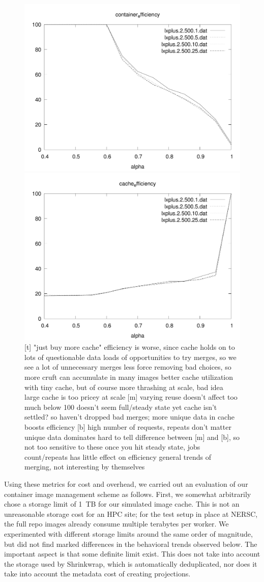 \documentclass[sigconf]{acmart}
\begin{document}
\begin{figure}
\includegraphics[width=0.48\linewidth]{curated/sensitivity/container_efficiency_uses_percent_plt.pdf}
\hfill
\includegraphics[width=0.48\linewidth]{curated/sensitivity/cache_efficiency_uses_percent_plt.pdf}
[t] "just buy more cache"
efficiency is worse, since cache holds on to lots of questionable data
loads of opportunities to try merges, so we see a lot of unnecessary merges
less force removing bad choices, so more cruft can accumulate in many images
better cache utilization with tiny cache, but of course more thrashing
at scale, bad idea
large cache is too pricey at scale
[m] varying reuse doesn't affect too much
below 100 doesn't seem full/steady state yet
cache isn't settled? so haven't dropped bad merges; more unique data in cache boosts efficiency
[b] high number of requests, repeats don't matter
unique data dominates
hard to tell difference between [m] and [b], so not too sensitive to these
once you hit steady state, jobs count/repeats has little effect on efficiency
general trends of merging, not interesting by themselves
\fi
\end{figure}

Using these metrics for cost and overhead,
we carried out an evaluation of our container image management scheme as follows.
First, we somewhat arbitrarily chose a storage limit of 1~TB for our simulated image cache.
This is not an unreasonable storage cost for an HPC site;
for the test setup in place at NERSC,
the full repo images already consume multiple terabytes per worker.
We experimented with different storage limits around the same order of magnitude,
but did not find marked differences in the behavioral trends observed below.
The important aspect is that some definite limit exist.
This does not take into account the storage used by Shrinkwrap,
which is automatically deduplicated,
nor does it take into account the metadata cost of creating projections.
\end{document}
